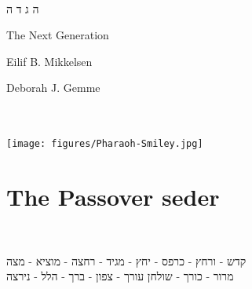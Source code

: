 \documentclass[letter,11pt,openany]{memoir}
\newenvironment{HgHebrew}{
\begin{hebrew}
	\strut\\
	\noindent\LARGE}{
\end{hebrew}
}
\begin{document}
\pagestyle{empty} \strut 
\vfill
\begin{center}
	\begin{HgHebrew}
		\fontsize{120pt}{120pt} \selectfont \hspace{-10pt} ה \hfill ג \hfill ד \hfill ה 
	\end{HgHebrew}
	\vspace{5em}
	
	\fontsize{37pt}{37pt} \selectfont The Next Generation
	
	\fontsize{20pt}{28pt} \selectfont Eilif B. Mikkelsen
	
	Deborah J. Gemme
	
	\\[.2em]
	
	\\[.5em]
	\texttt{[image: figures/Pharaoh-Smiley.jpg]} 
\end{center}
\vspace{10em} 
\vfill

%
%
%
\chapter*{The Passover seder}

\vfill

\vspace{-2em} 
\begin{HgHebrew}
	\begin{center}
		קדש - ורחץ - כרפס - יחץ - מגיד - רחצה - מוציא - מצה \\
		מרור - כורך - שולחן עורך - צפון - ברך - הלל - נירצה 
	\end{center}
\end{HgHebrew}
\end{document}

